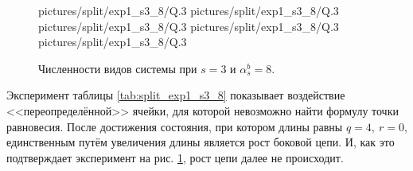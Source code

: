 \begin{figure}[H]
    \centering
       {pictures/split/exp1_s3_8/Q}{.3}
      {pictures/split/exp1_s3_8/Q}{.3}
      {pictures/split/exp1_s3_8/Q}{.3}
      {pictures/split/exp1_s3_8/Q}{.3}
      {pictures/split/exp1_s3_8/Q}{.3}
\caption{Численности видов системы при \(s=3\) и \(\alpha^b_s = 8\).} \label{fig:split_exp1_s3_8}
\end{figure}
Эксперимент таблицы \ref{tab:split_exp1_s3_8} показывает воздействие <<переопределённой>> ячейки, для которой невозможно найти формулу точки равновесия. После достижения состояния, при котором длины равны \(q=4, ~ r=0\), единственным путём увеличения длины является рост боковой цепи. И, как это подтверждает эксперимент на рис. \ref{fig:split_exp1_s3_8}, рост цепи далее не происходит.

